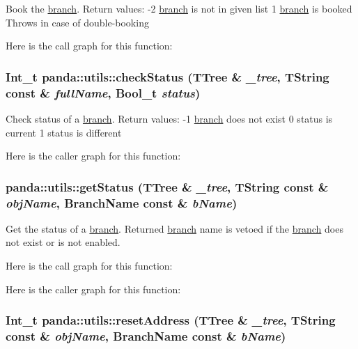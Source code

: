 Book the \hyperlink{namespacepanda_1_1branch}{branch}. Return values: -\/2 \hyperlink{namespacepanda_1_1branch}{branch} is not in given list 1 \hyperlink{namespacepanda_1_1branch}{branch} is booked Throws in case of double-\/booking 

Here is the call graph for this function:\hypertarget{namespacepanda_1_1utils_aafa411773a4b0ee829d99e6e5a0abdcd}{
\subsubsection[{checkStatus}]{\setlength{\rightskip}{0pt plus 5cm}Int\_\-t panda::utils::checkStatus (TTree \& {\em \_\-tree}, \/  TString const \& {\em fullName}, \/  Bool\_\-t {\em status})}}
\label{namespacepanda_1_1utils_aafa411773a4b0ee829d99e6e5a0abdcd}


Check status of a \hyperlink{namespacepanda_1_1branch}{branch}. Return values: -\/1 \hyperlink{namespacepanda_1_1branch}{branch} does not exist 0 status is current 1 status is different 

Here is the caller graph for this function:\hypertarget{namespacepanda_1_1utils_a8928c2bd486eae6103c33618c6eb4e80}{
\subsubsection[{getStatus}]{ panda::utils::getStatus (TTree \& {\em \_\-tree}, \/  TString const \& {\em objName}, \/  BranchName const \& {\em bName})}}
\label{namespacepanda_1_1utils_a8928c2bd486eae6103c33618c6eb4e80}


Get the status of a \hyperlink{namespacepanda_1_1branch}{branch}. Returned \hyperlink{namespacepanda_1_1branch}{branch} name is vetoed if the \hyperlink{namespacepanda_1_1branch}{branch} does not exist or is not enabled. 

Here is the call graph for this function:

Here is the caller graph for this function:\hypertarget{namespacepanda_1_1utils_a82a8530e64fbdf917cf9b8659065f98b}{
\subsubsection[{resetAddress}]{\setlength{\rightskip}{0pt plus 5cm}Int\_\-t panda::utils::resetAddress (TTree \& {\em \_\-tree}, \/  TString const \& {\em objName}, \/  BranchName const \& {\em bName})}}
\label{namespacepanda_1_1utils_a82a8530e64fbdf917cf9b8659065f98b}


